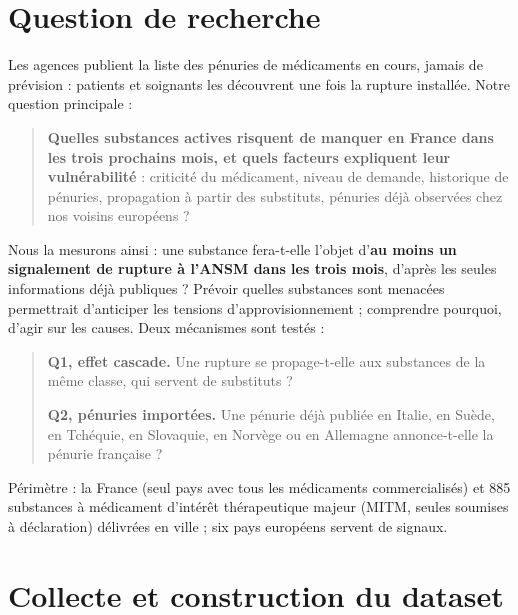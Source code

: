 
\section{Question de recherche}

Les agences publient la liste des pénuries de médicaments en cours, jamais de prévision : patients et soignants les
découvrent une fois la rupture installée. Notre question principale :

\begin{quote}
\large\textbf{Quelles substances actives risquent de manquer en France dans les trois prochains mois, et quels facteurs
expliquent leur vulnérabilité} : criticité du médicament, niveau de demande, historique de pénuries, propagation à
partir des substituts, pénuries déjà observées chez nos voisins européens ?
\end{quote}

Nous la mesurons ainsi : une substance fera-t-elle l'objet d'\textbf{au moins un signalement de rupture à l'ANSM dans les
trois mois}, d'après les seules informations déjà publiques ? Prévoir quelles substances sont menacées permettrait
d'anticiper les tensions d'approvisionnement ; comprendre pourquoi, d'agir sur les causes. Deux mécanismes sont testés :

\begin{quote}
\large\textbf{Q1, effet cascade.} Une rupture se propage-t-elle aux substances de la même classe, qui servent de
substituts ?\par\smallskip
\large\textbf{Q2, pénuries importées.} Une pénurie déjà publiée en Italie, en Suède, en Tchéquie, en Slovaquie, en Norvège
ou en Allemagne annonce-t-elle la pénurie française ?
\end{quote}

Périmètre : la France (seul pays avec tous les médicaments commercialisés) et 885 substances à médicament
d'intérêt thérapeutique majeur (MITM, seules soumises à déclaration) délivrées en ville ; six pays européens servent de signaux.

\section{Collecte et construction du dataset}


